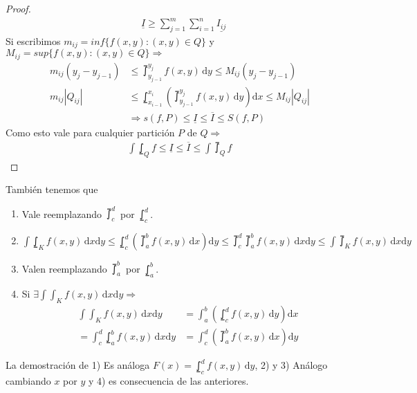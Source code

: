 \begin{theorem}
\begin{proof}
\begin{align*}
                                                              & \underline{I} \geq \sum_{j = 1}^m \sum_{i = 1}^n \underline{I_{ij}}
    \end{align*}
    Si escribimos $m_{ij} = inf\{ f(x, y) : (x, y) \in Q \}$ y $M_{ij} = sup\{ f(x, y) : (x, y) \in Q\} \Rightarrow$ \begin{align*}
      m_{ij} (y_j - y_{j-1}) & \leq \upint_{y_{j-1}}^{y_j} f(x, y)\, \mathrm{d} y \leq M_{ij} (y_j - y_{j-1})                                \\
      m_{ij} |Q_{ij}|        & \leq \lowint_{x_{i-1}}^{x_i} ( \upint_{y_{j-1}}^{y_j} f(x, y)\, \mathrm{d}y )\mathrm{d}x \leq M_{ij} |Q_{ij}| \\
                             & \Rightarrow s(f, P) \leq \underline{I} \leq \overline{I} \leq S(f, P)
    \end{align*}
    Como esto vale para cualquier partición $P$ de $Q \Rightarrow$ \begin{align*}
      \int\lowint_Q f \leq \underline{I} \leq \overline{I} \leq \int\upint_Q f
    \end{align*}
  \end{proof}
\end{theorem}

\clearpage

\begin{note}
  También tenemos que

  \begin{enumerate}
    \item Vale reemplazando $\upint_c^d$ por $\lowint_c^d$.
    \item $ \int \lowint_K f(x, y) \, \mathrm{d}x \mathrm{d}y \leq \lowint_c^d ( \upint_a^b f(x, y)\, \mathrm{d}x ) \mathrm{d}y \leq \upint_c^d \upint_a^b f(x, y) \, \mathrm{d}x \mathrm{d}y \leq \int \upint_K f(x, y) \, \mathrm{d}x \mathrm{d}y $
    \item Valen reemplazando $\upint_a^b$ por $\lowint_a^b$.
    \item Si $\exists \int \int_K f(x, y) \, \mathrm{d}x \mathrm{d}y \Rightarrow$ \begin{align*}
            \int \int_K f(x, y) \, \mathrm{d}x \mathrm{d}y & = \int_a^b(\lowint_c^d f(x, y) \, \mathrm{d}y)\mathrm{d}x \\ 
             = \int_c^d \lowint_a^b f(x, y) \, \mathrm{d}x \mathrm{d}y & = \int_c^d(\upint_a^b f(x,y) \, \mathrm{d}x)\mathrm{d}y
    \end{align*}
  \end{enumerate}

  La demostración de 1) Es análoga $F(x) = \lowint_c^d f(x, y) \, \mathrm{d}y$, 2) y 3) Análogo cambiando $x$ por $y$ y 4) es consecuencia de las anteriores.
\end{note}

